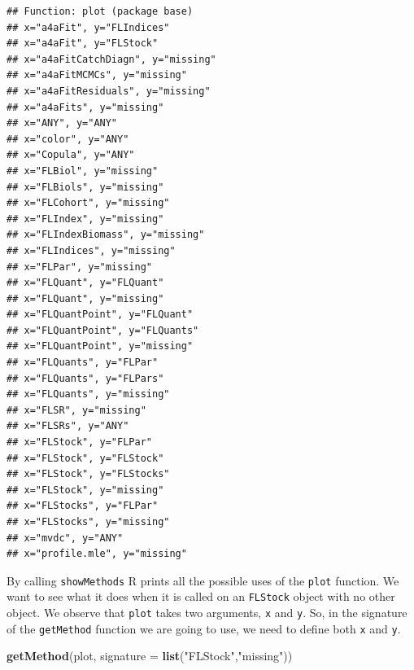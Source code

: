 \documentclass[
]{book}
\newenvironment{Shaded}{\begin{snugshade}}{\end{snugshade}}
\newcommand{\AttributeTok}[1]{\textcolor[rgb]{0.13,0.29,0.53}{#1}}
\newcommand{\FunctionTok}[1]{\textcolor[rgb]{0.13,0.29,0.53}{\textbf{#1}}}
\newcommand{\NormalTok}[1]{#1}
\newcommand{\StringTok}[1]{\textcolor[rgb]{0.31,0.60,0.02}{#1}}
\begin{document}
\begin{verbatim}
## Function: plot (package base)
## x="a4aFit", y="FLIndices"
## x="a4aFit", y="FLStock"
## x="a4aFitCatchDiagn", y="missing"
## x="a4aFitMCMCs", y="missing"
## x="a4aFitResiduals", y="missing"
## x="a4aFits", y="missing"
## x="ANY", y="ANY"
## x="color", y="ANY"
## x="Copula", y="ANY"
## x="FLBiol", y="missing"
## x="FLBiols", y="missing"
## x="FLCohort", y="missing"
## x="FLIndex", y="missing"
## x="FLIndexBiomass", y="missing"
## x="FLIndices", y="missing"
## x="FLPar", y="missing"
## x="FLQuant", y="FLQuant"
## x="FLQuant", y="missing"
## x="FLQuantPoint", y="FLQuant"
## x="FLQuantPoint", y="FLQuants"
## x="FLQuantPoint", y="missing"
## x="FLQuants", y="FLPar"
## x="FLQuants", y="FLPars"
## x="FLQuants", y="missing"
## x="FLSR", y="missing"
## x="FLSRs", y="ANY"
## x="FLStock", y="FLPar"
## x="FLStock", y="FLStock"
## x="FLStock", y="FLStocks"
## x="FLStock", y="missing"
## x="FLStocks", y="FLPar"
## x="FLStocks", y="missing"
## x="mvdc", y="ANY"
## x="profile.mle", y="missing"
\end{verbatim}

By calling \texttt{showMethods} R prints all the possible uses of the \texttt{plot} function. We want to see what it does when it is called on an \texttt{FLStock} object with no other object. We observe that \texttt{plot} takes two arguments, \texttt{x} and \texttt{y}. So, in the signature of the \texttt{getMethod} function we are going to use, we need to define both \texttt{x} and \texttt{y}.

\begin{Shaded}
\begin{Highlighting}[]
\FunctionTok{getMethod}\NormalTok{(}\StringTok{\textquotesingle{}plot\textquotesingle{}}\NormalTok{, }\AttributeTok{signature =} \FunctionTok{list}\NormalTok{(}\StringTok{"FLStock"}\NormalTok{,}\StringTok{"missing"}\NormalTok{))}
\end{Highlighting}
\end{Shaded}
\end{document}
